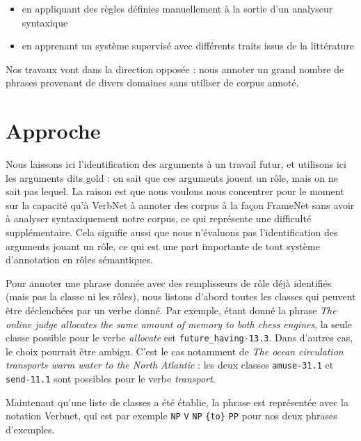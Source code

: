 \begin{itemize}

    \item en appliquant des règles définies manuellement à la sortie d'un
        analyseur syntaxique

    \item en apprenant un système supervisé avec différents traits issus de la
        littérature

\end{itemize}

Nos travaux vont dans la direction opposée : nous annoter un grand nombre de
phrases provenant de divers domaines sans utiliser de corpus annoté.

\section{Approche}

Nous laissons ici l'identification des arguments à un travail futur, et
utilisons ici les arguments dits gold : on sait que ces arguments jouent un
rôle, mais on ne sait pas lequel. La raison est que nous voulons nous
concentrer pour le moment sur la capacité qu'à VerbNet à annoter des corpus à
la façon FrameNet sans avoir à analyser syntaxiquement notre corpus, ce qui
représente une difficulté supplémentaire. Cela signifie aussi que nous
n'évaluons pas l'identification des arguments jouant un rôle, ce qui est une
part importante de tout système d'annotation en rôles sémantiques.

Pour annoter une phrase donnée avec des remplisseurs de rôle déjà identifiés
(mais pas la classe ni les rôles), nous listons d'abord toutes les classes qui
peuvent être déclenchées par un verbe donné. Par exemple, étant donné la phrase
\emph{The online judge allocates the same amount of memory to both chess
engines}, la seule classe possible pour le verbe \emph{allocate} est
\texttt{future\_having-13.3}. Dans d'autres cas, le choix pourrait être ambigu.
C'est le cas notamment de \emph{The ocean circulation transports warm water to
the North Atlantic} : les deux classes \texttt{amuse-31.1} et
\texttt{send-11.1} sont possibles pour le verbe \emph{transport}.

Maintenant qu'une liste de classes a été établie, la phrase est représentée
avec la notation Verbnet, qui est par exemple \texttt{NP} \texttt{V}
\texttt{NP} \texttt{\{to\}} \texttt{PP} pour nos deux phrases d'exemples.


